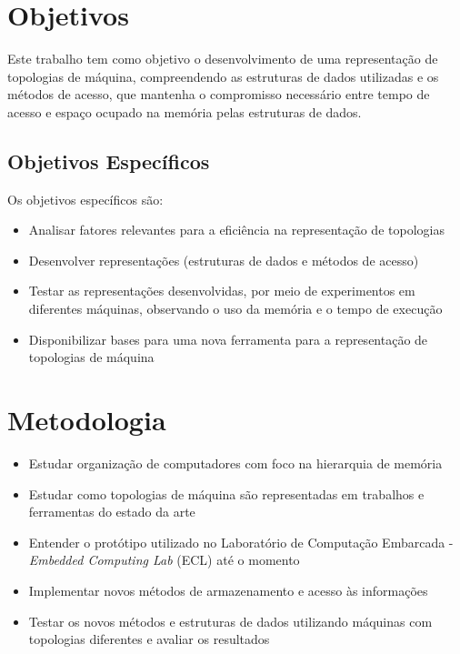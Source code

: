 \section{Objetivos}
\label{sec:objetivos}

Este trabalho tem como objetivo o desenvolvimento de uma representação de topologias de máquina, compreendendo as estruturas de dados utilizadas e os métodos de acesso, que mantenha o compromisso necessário entre tempo de acesso e espaço ocupado na memória pelas estruturas de dados.

\subsection{Objetivos Específicos}
\label{subsec:objetivos_especificos}

Os objetivos específicos são:
\begin{itemize}
	\item Analisar fatores relevantes para a eficiência na representação de topologias
	\item Desenvolver representações (estruturas de dados e métodos de acesso)
	\item Testar as representações desenvolvidas, por meio de experimentos em diferentes máquinas, observando o uso da memória e o tempo de execução
	\item Disponibilizar bases para uma nova ferramenta para a representação de topologias de máquina
\end{itemize}



\section{Metodologia}
\label{sec:metodologia}

\begin{itemize}
	\item Estudar organização de computadores com foco na hierarquia de memória
	\item Estudar como topologias de máquina são representadas em trabalhos e ferramentas do estado da arte
	\item Entender o protótipo utilizado no Laboratório de Computação Embarcada - \textit{Embedded Computing Lab} (ECL) até o momento
	\item Implementar novos métodos de armazenamento e acesso às informações
	\item Testar os novos métodos e estruturas de dados utilizando máquinas com topologias diferentes e avaliar os resultados
\end{itemize}



